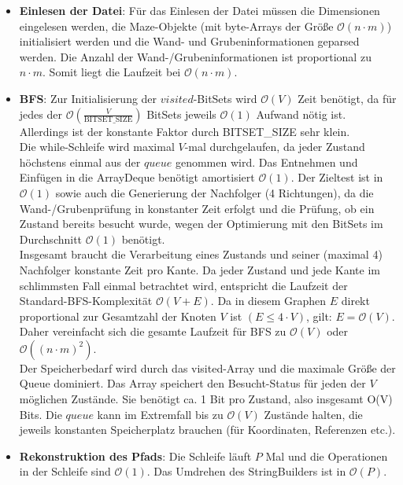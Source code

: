 \documentclass[a4paper,10pt,ngerman]{scrartcl}
\begin{document}
\begin{itemize}
    \item \textbf{Einlesen der Datei}: Für das Einlesen der Datei müssen die Dimensionen eingelesen werden, die Maze-Objekte (mit byte-Arrays der Größe $\mathcal{O}(n\cdot m)$) initialisiert werden und die Wand- und Grubeninformationen geparsed werden. Die Anzahl der Wand-/Grubeninformationen ist proportio\-nal zu $n\cdot m$. Somit liegt die Laufzeit bei $\mathcal{O}(n\cdot m)$.
    \item \textbf{BFS}: Zur Initialisierung der $visited$-BitSets wird $\mathcal{O}(V)$ Zeit benötigt, da für jedes der $\mathcal{O}(\frac{V}{\text{BITSET\_SIZE}})$ BitSets jeweils $\mathcal{O}(1)$ Aufwand nötig ist. Allerdings ist der konstante Faktor durch BITSET\_SIZE sehr klein. \\
    Die while-Schleife wird maximal $V$-mal durchgelaufen, da jeder Zustand höchstens einmal aus der $queue$ genommen wird. Das Entnehmen und Einfügen in die ArrayDeque benötigt amortisiert $\mathcal{O}(1)$. Der Zieltest ist in $\mathcal{O}(1)$ sowie auch die Generierung der Nachfolger (4 Richtungen), da die Wand-/Grubenprüfung in konstanter Zeit erfolgt und die Prüfung, ob ein Zustand bereits besucht wurde, wegen der Optimierung mit den BitSets im Durchschnitt $\mathcal{O}(1)$ benötigt. \\
    Insgesamt braucht die Verarbeitung eines Zustands und seiner (maximal 4) Nachfolger konstante Zeit pro Kante. Da jeder Zustand und jede Kante im schlimmsten Fall einmal betrachtet wird, entspricht die Laufzeit der Standard-BFS-Komplexität $\mathcal{O}(V + E)$. Da in diesem Graphen $E$ direkt proportional zur Gesamtzahl der Knoten $V$ ist $(E \le 4 \cdot V)$, gilt: $E = \mathcal{O}(V)$. Daher vereinfacht sich die gesamte Laufzeit für BFS zu $\mathcal{O}(V)$ oder $\mathcal{O}((n\cdot m)^2)$.\\
    Der Speicherbedarf wird durch das visited-Array und die maximale Größe der Queue dominiert. Das Array speichert den Besucht-Status für jeden der $V$ möglichen Zustände. Sie benötigt ca. 1 Bit pro Zustand, also insgesamt O(V) Bits. Die $queue$ kann im Extremfall bis zu $\mathcal{O}(V)$ Zustände halten, die jeweils konstanten Speicherplatz brauchen (für Koordinaten, Referenzen etc.).
    \item \textbf{Rekonstruktion des Pfads}: Die Schleife läuft $P$ Mal und die Operationen in der Schleife sind $\mathcal{O}(1)$. Das Umdrehen des StringBuilders ist in $\mathcal{O}(P)$. 
\end{itemize}
\end{document}
